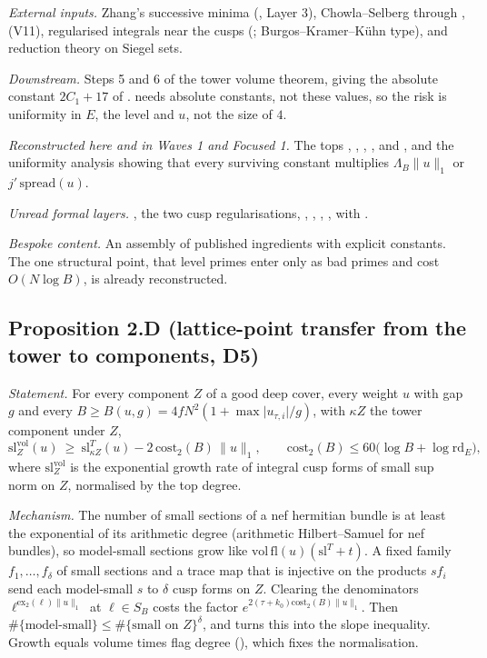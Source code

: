 \documentclass[11pt]{article}
\theoremstyle{remark}
\begin{document}
\emph{External inputs.} Zhang's successive minima (, Layer 3), Chowla--Selberg through ,  (V11), regularised integrals near the cusps (; Burgos--Kramer--Kühn type), and reduction theory on Siegel sets.

\emph{Downstream.} Steps 5 and 6 of the tower volume theorem, giving the absolute constant $2C_1+17$ of .  needs absolute constants, not these values, so the risk is uniformity in $E$, the level and $u$, not the size of $4$.

\emph{Reconstructed here and in Waves 1 and Focused 1.} The tops , , , ,  and , and the uniformity analysis showing that every surviving constant multiplies $\Lambda_B\lVert u\rVert_1$ or $j'\,\mathrm{spread}(u)$.

\emph{Unread formal layers.} , the two cusp regularisations, , , , ,  with .

\emph{Bespoke content.} An assembly of published ingredients with explicit constants. The one structural point, that level primes enter only as bad primes and cost $O(N\log B)$, is already reconstructed.

\subsection*{Proposition 2.D (lattice-point transfer from the tower to components, D5)}

\emph{Statement.} For every component $Z$ of a good deep cover, every weight $u$ with gap $g$ and every $B\ge B(u,g)=4fN^2(1+\max\lvert u_{\tau,i}\rvert/g)$, with $\kappa Z$ the tower component under $Z$,
\[
\mathrm{sl}^{\mathrm{vol}}_Z(u)\ \ge\ \mathrm{sl}^T_{\kappa Z}(u)-2\,\mathrm{cost}_2(B)\,\lVert u\rVert_1,\qquad\mathrm{cost}_2(B)\le60\bigl(\log B+\log\mathrm{rd}_E\bigr),
\]
where $\mathrm{sl}^{\mathrm{vol}}_Z$ is the exponential growth rate of integral cusp forms of small sup norm on $Z$, normalised by the top degree.

\emph{Mechanism.} The number of small sections of a nef hermitian bundle is at least the exponential of its arithmetic degree (arithmetic Hilbert--Samuel for nef bundles), so model-small sections grow like $\mathrm{vol}\,\mathrm{fl}(u)(\mathrm{sl}^T+t)$. A fixed family $f_1,\dots,f_\delta$ of small sections and a trace map that is injective on the products $sf_i$ send each model-small $s$ to $\delta$ cusp forms on $Z$. Clearing the denominators $\ell^{\mathrm{ex}_2(\ell)\lVert u\rVert_1}$ at $\ell\in S_B$ costs the factor $e^{2(\tau+k_0)\mathrm{cost}_2(B)\lVert u\rVert_1}$. Then $\#\{\text{model-small}\}\le\#\{\text{small on }Z\}^\delta$, and  turns this into the slope inequality. Growth equals volume times flag degree (), which fixes the normalisation.
\end{document}
